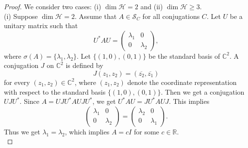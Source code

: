 \documentclass[11pt]{amsart}
\theoremstyle{remark}
\newcommand{\cH}{{\mathcal{H}}}
\newcommand{\SC}{\mathcal{S}_C}
\begin{document}
\begin{proof}
We consider two cases: (i) $\dim \cH=2$ and (ii) $\dim \cH \ge 3$.\\
(i) Suppose $\dim \cH=2$. Assume that $A \in \SC$ for all conjugations $C$. Let $U$ be a unitary matrix such that 
\[
U^{*}AU=\begin{pmatrix}
\lambda_1 & 0  \\
0 & \lambda_2 
\end{pmatrix},
\]
 where $\sigma(A)=\{ \lambda_1, \lambda_2\}$. Let $\{(1,0) ,(0,1)\}$ be the standard basis of $\mathbb{C}^2$. 
A conjugation $J$ on $\mathbb{C}^2$ is defined by
\[
J(z_1, z_2)
=
(\overline{z_2}, \overline{z_1})
\]
for every $(z_1,z_2)\in\mathbb{C}^2$, where $(z_1,z_2)$ denote the coordinate representation with respect to the standard basis $\{(1,0) ,(0,1)\}$.  Then we get a conjugation $UJU^{*}$.  Since $A=UJU^{*}AUJU^{*}$, we get $U^{*}AU=JU^{*}AUJ$.  This implies 
\[
\begin{pmatrix}
\lambda_1 & 0 \\
0 & \lambda_2 
\end{pmatrix}=\begin{pmatrix}
\lambda_2 & 0 \\
0 & \lambda_1 
\end{pmatrix}.
\]
Thus we get $\lambda_1=\lambda_2$, which implies $A=cI$ for some $c \in \mathbb{R}$. \\


\end{proof}
\end{document}
